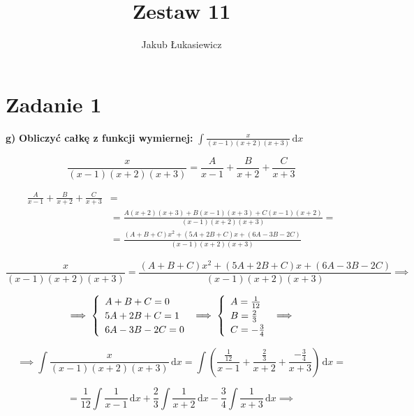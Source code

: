 \documentclass[12pt]{article}
\title{Zestaw 11}
\author{Jakub Łukasiewicz}
\date{}
\newcommand{\ex}[1]{\textbf{ #1)}}
\newcommand{\Integral}[2]{\int \! #1 \, \mathrm{d}#2}
\newcommand{\task}[1]{\section*{Zadanie #1}}
\begin{document}
\maketitle

\task{1}\ex{g}
\textbf{Obliczyć całkę z funkcji wymiernej: }
$ \displaystyle \Integral{\frac{x}{(x-1)(x+2)(x+3)}}{x} $

$$ \frac{x}{(x-1)(x+2)(x+3)} = \frac{A}{x-1} + \frac{B}{x+2} + \frac{C}{x+3} $$

\begin{equation*}
    \begin{aligned}
        \frac{A}{x-1} + \frac{B}{x+2} + \frac{C}{x+3} &=\\
        &= \frac{A(x+2)(x+3) + B(x-1)(x+3) + C(x-1)(x+2)}{(x-1)(x+2)(x+3)} =\\
        &= \frac{(A+B+C)x^2 + (5A+2B+C)x + (6A-3B-2C)}{(x-1)(x+2)(x+3)}
    \end{aligned}
\end{equation*}

\begin{equation*}
    \frac{x}{(x-1)(x+2)(x+3)} = \frac{(A+B+C)x^2 + (5A+2B+C)x + (6A-3B-2C)}{(x-1)(x+2)(x+3)} \implies
\end{equation*}

\begin{equation*}
    \implies \left\{ \begin{array}{l}
        A+B+C = 0        \\
        5A + 2B + C = 1  \\
        6A - 3B - 2C = 0
    \end{array} \right. \implies
    \def\arraystretch{1.2}
    \left\{ \begin{array}{l}
        A = \frac{1}{12} \\
        B = \frac{2}{3}  \\
        C = -\frac{3}{4}
    \end{array} \right. \implies
\end{equation*}

\begin{equation*}
    \implies \Integral{\frac{x}{(x-1)(x+2)(x+3)}}{x} =
    \Integral{\left(\frac{\frac{1}{12}}{x-1} + \frac{\frac{2}{3}}{x+2} + \frac{-\frac{3}{4}}{x+3}\right)}{x} =
\end{equation*}

\begin{equation*}
    = \frac{1}{12}\Integral{\frac{1}{x-1}}{x}
    + \frac{2}{3}\Integral{\frac{1}{x+2}}{x}
    - \frac{3}{4}\Integral{\frac{1}{x+3}}{x}
    \implies
\end{equation*}
\end{document}
